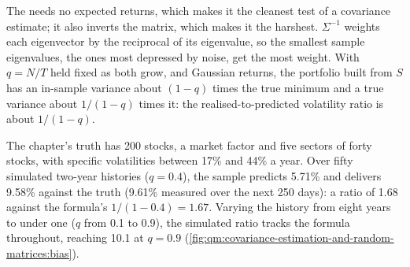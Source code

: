 The  needs no expected returns, which makes it the cleanest test of a covariance estimate; it also inverts the matrix, which makes
it the harshest. $\Sigma^{-1}$ weights each eigenvector by the reciprocal of its eigenvalue, so the smallest sample eigenvalues, the ones most depressed by
noise, get the most weight. With $q = N/T$ held fixed as both grow, and Gaussian returns, the portfolio built from $S$ has an in-sample variance about $(1 - q)$
times the true minimum and a true variance about $1/(1 - q)$ times it: the realised-to-predicted volatility ratio is about $1/(1 - q)$.

The chapter's truth has 200 stocks, a market factor and five sectors of forty stocks, with specific volatilities between 17\% and 44\% a year. Over fifty
simulated two-year histories ($q = 0.4$), the sample  predicts 5.71\% and delivers 9.58\% against the truth (9.61\% measured over the next 250
days): a ratio of 1.68 against the formula's $1/(1 - 0.4) = 1.67$. Varying the history from eight years to under one ($q$ from 0.1 to 0.9), the simulated ratio tracks
the formula throughout, reaching 10.1 at $q = 0.9$ (\cref{fig:qm:covariance-estimation-and-random-matrices:bias}).

\begin{omfigure}

\label{fig:qm:covariance-estimation-and-random-matrices:bias}
\end{omfigure}

